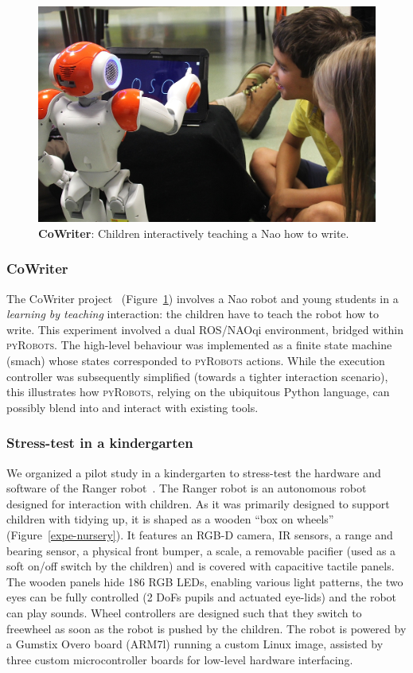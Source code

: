 \documentclass[a4paper, 10pt, conference]{ieeeconf}      %
\newcommand{\pyRobots}{\textsc{pyRobots}}
\begin{document}
\begin{figure}
        \centering
        \includegraphics[width=0.9\columnwidth]{cowriter}
        \caption{\textbf{CoWriter}: Children interactively teaching a Nao how to
        write.}
        \label{expe-cowriter}
\end{figure}

\subsubsection{CoWriter} The {\sc CoWriter} project~\cite{hood2015those}
(Figure~\ref{expe-cowriter}) involves a Nao robot and young students
in a \emph{learning by teaching} interaction: the children have to teach the
robot how to write. This experiment involved a dual ROS/NAOqi environment,
bridged within \pyRobots{}. The high-level behaviour was implemented as a finite
state machine ({\sc smach}) whose states corresponded to \pyRobots{} actions.
While the execution controller was subsequently simplified (towards a tighter
interaction scenario), this illustrates how \pyRobots{}, relying on the
ubiquitous Python language, can possibly blend into and interact with existing
tools.

\subsubsection{Stress-test in a kindergarten}
\label{croq}

We organized a pilot study in a kindergarten to stress-test the hardware and
software of the Ranger robot~\cite{mondada2014ranger}. The Ranger robot is an
autonomous robot designed for interaction with children. As it was primarily
designed to support children with tidying up, it is shaped as a wooden ``box on
wheels'' (Figure~\ref{expe-nursery}). It features an RGB-D camera, IR sensors, a
range and bearing sensor, a physical front bumper, a scale, a removable pacifier
(used as a soft on/off switch by the children) and is covered with capacitive
tactile panels. The wooden panels hide 186 RGB LEDs, enabling various light
patterns, the two eyes can be fully controlled (2 DoFs pupils and actuated
eye-lids) and the robot can play sounds. Wheel controllers are designed such
that they switch to freewheel as soon as the robot is pushed by the children.
The robot is powered by a Gumstix Overo board (ARM7l) running a custom Linux
image, assisted by three custom microcontroller boards for low-level hardware
interfacing.
\end{document}
